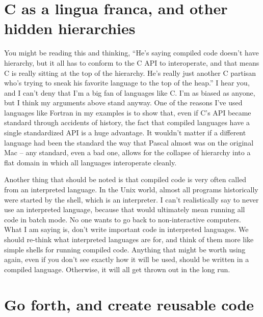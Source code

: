 \documentclass[12pt]{article}
\begin{document}
\section{C as a lingua franca, and other hidden hierarchies}

You might be reading this and thinking, ``He's saying compiled code doesn't
have hierarchy, but it all has to conform to the C API to interoperate, and
that means C is really sitting at the top of the hierarchy. He's really just
another C partisan who's trying to sneak his favorite language to the top of
the heap.'' I hear you, and I can't deny that I'm a big fan of languages like
C. I'm as biased as anyone, but I think my arguments above stand anyway. One of
the reasons I've used languages like Fortran in my examples is to show that,
even if C's API became standard through accidents of history, the fact that
compiled languages have a single standardized API is a huge advantage. It
wouldn't matter if a different language had been the standard the way that
Pascal almost was on the original Mac -- any standard, even a bad one, allows
for the collapse of hierarchy into a flat domain in which all languages
interoperate cleanly.

Another thing that should be noted is that compiled code is very often called
from an interpreted language. In the Unix world, almost all programs
historically were started by the shell, which is an interpreter. I can't
realistically say to never use an interpreted language, because that would
ultimately mean running all code in batch mode. No one wants to go back to
non-interactive computers. What I am saying is, don't write important code in
interpreted languages. We should re-think what interpreted languages are for,
and think of them more like simple shells for running compiled code. Anything
that might be worth using again, even if you don't see exactly how it will be
used, should be written in a compiled language. Otherwise, it will all get
thrown out in the long run.


\section{Go forth, and create reusable code}
\end{document}
